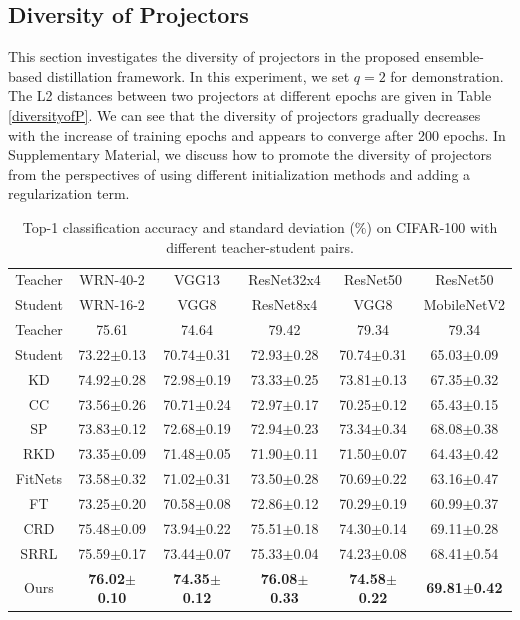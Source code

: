 \documentclass{article}
\begin{document}
\subsection{Diversity of Projectors} \label{diversitysection}
This section investigates the diversity of projectors in the proposed ensemble-based distillation framework. In this experiment, we set $q=2$ for demonstration. The L2 distances between two projectors at different epochs are given in Table \ref{diversityofP}. We can see that the diversity of projectors gradually decreases with the increase of training epochs and appears to converge after 200 epochs. In Supplementary Material, we discuss how to promote the diversity of projectors from the perspectives of using different initialization methods and adding a regularization term. 

\begin{table}[t]
    \caption{Top-1 classification accuracy and standard deviation ($\%$) on CIFAR-100 with different teacher-student pairs.}
    \label{tableCIFAR}
    \centering
    \begin{tabular}{c|ccccc}
    \hline
    Teacher &WRN-40-2    &VGG13  &ResNet32x4  &ResNet50 &ResNet50        \\
    Student &WRN-16-2   &VGG8    &ResNet8x4 &VGG8    &MobileNetV2      \\
    \hline
    Teacher &75.61  &74.64 &79.42 &79.34 &79.34 \\
    Student &73.22$\pm$0.13  &70.74$\pm$0.31 &72.93$\pm$0.28 &70.74$\pm$0.31 &65.03$\pm$0.09\\
    KD   &74.92$\pm$0.28  &72.98$\pm$0.19 &73.33$\pm$0.25 &73.81$\pm$0.13 &67.35$\pm$0.32\\
    CC &73.56$\pm$0.26  &70.71$\pm$0.24 &72.97$\pm$0.17 &70.25$\pm$0.12 &65.43$\pm$0.15\\
    SP &73.83$\pm$0.12 &72.68$\pm$0.19 &72.94$\pm$0.23 &73.34$\pm$0.34 &68.08$\pm$0.38\\
    RKD &73.35$\pm$0.09  &71.48$\pm$0.05 &71.90$\pm$0.11 &71.50$\pm$0.07 &64.43$\pm$0.42  \\
    FitNets &73.58$\pm$0.32  &71.02$\pm$0.31 &73.50$\pm$0.28 &70.69$\pm$0.22 &63.16$\pm$0.47\\
    FT &73.25$\pm$0.20 &70.58$\pm$0.08 &72.86$\pm$0.12 &70.29$\pm$0.19 &60.99$\pm$0.37 \\
    CRD  &75.48$\pm$0.09  &73.94$\pm$0.22 &75.51$\pm$0.18 &74.30$\pm$0.14 &69.11$\pm$0.28\\
    SRRL &75.59$\pm$0.17 &73.44$\pm$0.07 &75.33$\pm$0.04 &74.23$\pm$0.08 &68.41$\pm$0.54\\
    Ours &\textbf{76.02$\pm$0.10} &\textbf{74.35$\pm$0.12} &\textbf{76.08$\pm$0.33} &\textbf{74.58$\pm$0.22} &\textbf{69.81$\pm$0.42} \\
    \hline
    \end{tabular}
\end{table}
\end{document}
